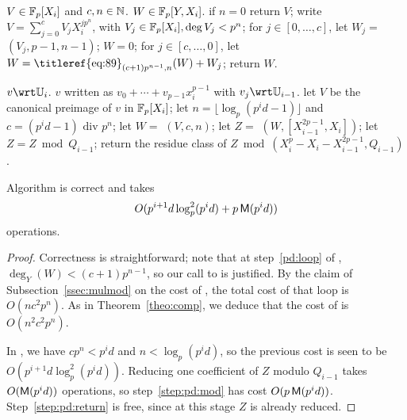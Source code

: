 \begin{algorithm}
  \caption{}
  \label{alg:push-down-rec}
  \begin{algorithmic}[1]
    \REQUIRE $V\in \mathbb{F}_p[X_i]$ and $c,n\in\mathbb{N}$.
    \ENSURE $W \in\mathbb{F}_p[Y,X_i]$.
    \STATE if $n=0$ return $V$;
    \STATE write $V=\sum_{j=0}^{c} V_j X_i^{jp^n}$, with $V_j \in \mathbb{F}_p[X_i], \deg V_j<p^n$;
    \STATE for $j\in [0,\dots,c]$, let $W_j=$ $(V_j,p-1,n-1)$;
    \STATE $W=0$;
    \STATE\label{pd:loop} for $j\in [c,\dots,0]$, let $W=\text{\titleref{eq:89}}_{(c+1)p^{n-1},n}(W) + W_j$;
    \STATE return $W$.
  \end{algorithmic}
\end{algorithm}

\begin{algorithm}
  \caption{}
  \label{alg:push-down}
  \begin{algorithmic}[1]
    \REQUIRE $v\wrt \U_i$.
    \ENSURE $v$ written as $v_0+\cdots+v_{p-1}x_i^{p-1}$ with $v_j \wrt \U_{i-1}$.
    \STATE let $V$ be the canonical preimage of $v$ in $\mathbb{F}_p[X_i]$;
    \STATE let $n=\lfloor \log_p(p^id-1) \rfloor$ and $c=(p^id-1)\text{ div } p^n$;
    \STATE let $W =$ $(V,c,n)$;
    \STATE let $Z =$ $(W,[X_{i-1}^{2p-1},X_i])$;
    \STATE \label{step:pd:mod} let $Z = Z \bmod Q_{i-1}$;
    \STATE \label{step:pd:return} return the residue class of $Z \bmod (X_i^p - X_i - X_{i-1}^{2p-1},Q_{i-1})$.
  \end{algorithmic}
\end{algorithm}

\begin{proposition}\label{prop:pd}
  Algorithm  is correct and takes 
  \begin{equation}
    \label{eq:92}
    O(p^{i+1}d
    \log_p^2(p^id) + p\,\mathsf{M}(p^id))
  \end{equation}
  operations.
\end{proposition}
\begin{proof}
  Correctness is straightforward; note that at step~\ref{pd:loop} of
  , $\deg_Y(W)\allowbreak < (c+1)p^{n-1}$,
  so our call to  is justified. By the claim of
  Subsection~\ref{ssec:mulmod} on the cost of , the
  total cost of that loop is $O(nc^2p^n)$. As in
  Theorem~\ref{theo:comp}, we deduce that the cost of
   is $O(n^2c^2p^n)$.

  In , we have $cp^n< p^id$ and $n<\log_p
  (p^id)$, so the previous cost is seen to be $O(p^{i+1}d
  \log_p^2(p^id))$. Reducing one coefficient of $Z$ modulo $Q_{i-1}$
  takes $O(\mathsf{M}(p^id))$ operations, so step~\ref{step:pd:mod} has
  cost $O(p\,\mathsf{M}(p^id))$. Step~\ref{step:pd:return} is free, since
  at this stage $Z$ is already reduced.
\end{proof}

